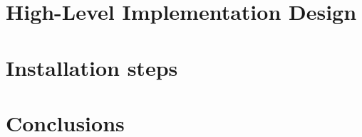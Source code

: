 \documentclass[a4paper, 11pt, twoside]{report}
\begin{document}
\chapter{High-Level Implementation Design}


\chapter{Installation steps}


\chapter{Conclusions}





\end{document}
